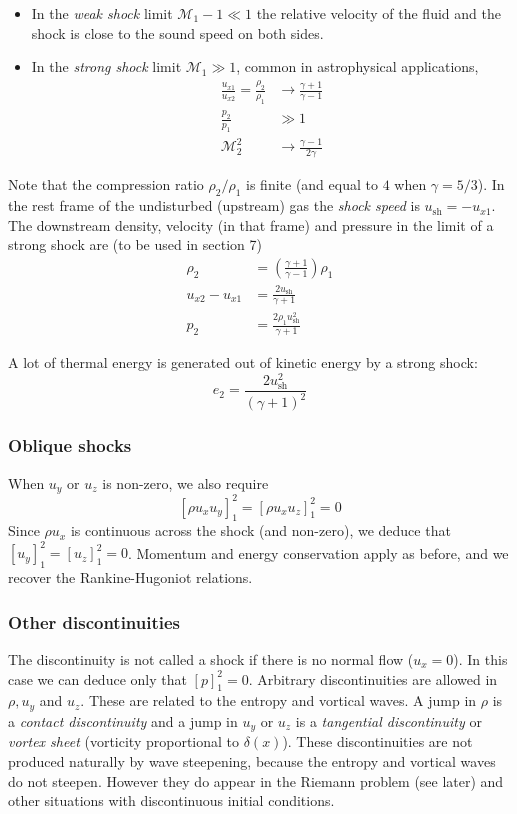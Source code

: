 \documentclass{jknotes}
\newcommand{\dif}[1]{\left[#1\right]_1^2}
\newcommand{\M}{\mathcal{M}}
\begin{document}
\begin{itemize}
	\item In the \emph{weak shock} limit $\M_1 - 1 \ll 1$ the relative
		velocity of the fluid and the shock is close to the sound speed on
		both sides.
	\item In the \emph{strong shock} limit $\M_1 \gg 1$, common in
		astrophysical applications,
		\begin{align}
			\frac{u_{x1}}{u_{x2}} = \frac{\rho_2}{\rho_1} &\to \frac{\gamma +
			1}{\gamma -1} \\
				\frac{p_2}{p_1} &\gg 1 \\
				\M_2^2 &\to \frac{\gamma -1}{2 \gamma}
		\end{align}
\end{itemize}
Note that the compression ratio $\rho_2/\rho_1$ is finite (and equal to $4$
when $\gamma = 5/3$). In the rest frame of the undisturbed (upstream) gas the 
\emph{shock speed} is $u_{\text{sh}} = -u_{x1}$. The downstream density,
velocity (in that frame) and pressure in the limit of a strong shock are (to
be used in section 7)
\begin{align}
	\rho_2 &= \left(\frac{\gamma +1}{\gamma -1}\right) \rho_1 \\
	u_{x2} - u_{x1} &= \frac{2u_{\text{sh}}}{\gamma +1} \\
	p_2 &= \frac{2 \rho_1 u_{\text{sh}}^2}{\gamma +1}
\end{align}

A lot of thermal energy is generated out of kinetic energy by a strong shock:
\begin{equation}
	e_2 = \frac{2 u_{\text{sh}}^2}{(\gamma+1)^2}
\end{equation}

\subsubsection{Oblique shocks}
When $u_y$ or $u_z$ is non-zero, we also require
\begin{equation}
	\dif{\rho u_x u_y} = \dif{\rho u_x u_z} = 0
\end{equation}
Since $\rho u_x$ is continuous across the shock (and non-zero), we deduce that
$\dif{u_y} = \dif{u_z} = 0$. Momentum and energy conservation apply as before,
and we recover the Rankine-Hugoniot relations.

\subsubsection{Other discontinuities}
The discontinuity is not called a shock if there is no normal flow ($u_x =0$).
In this case we can deduce only that $\dif{p} = 0$. Arbitrary discontinuities
are allowed in $\rho, u_y$ and $u_z$. These are related to the entropy and
vortical waves. A jump in $\rho$ is a \emph{contact discontinuity} and a jump
in $u_y$ or $u_z$ is a \emph{tangential discontinuity} or \emph{vortex sheet}
(vorticity proportional to $\delta(x)$). These discontinuities are not
produced naturally by wave steepening, because the entropy and vortical waves
do not steepen. However they do appear in the Riemann problem (see later) and
other situations with discontinuous initial conditions.
\end{document}
